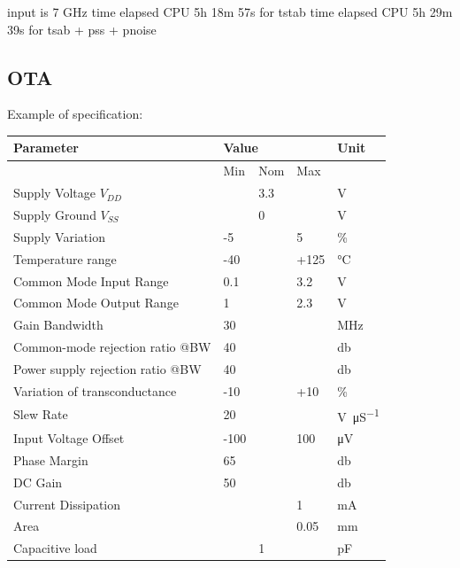 \documentclass{article}
\begin{document}
input is 7 GHz 
time elapsed CPU 5h 18m 57s for tstab 
time elapsed CPU 5h 29m 39s for tsab + pss + pnoise

\subsection{OTA}

Example of specification:

\begin{table}[ht!]
	\begin{tabular}{|l|l|l|l|l|}
		\rowcolor{LightCyan}\hline
		Parameter                        & \multicolumn{3}{l|}{Value}                & Unit\\ \hline
			                        & Min & Nom & Max              & \\ \hline
		Supply Voltage $V_{DD}$                 & & 3.3 & & \unit{\volt} \\ \hline
		Supply Ground   $V_{SS}$                 & & 0 & & \unit{\volt} \\ \hline
		Supply Variation                 & -5 & & 5     &   \unit{\percent}        \\ \hline
		Temperature range                & -40 & & +125 & \unit{\degreeCelsius}     \\ \hline
		Common Mode Input Range          & 0.1 & & 3.2 & \unit{\volt}        \\ \hline
		Common Mode Output Range         & 1  & & 2.3    &   \unit{\volt}    \\ \hline
		Gain Bandwidth                   & 30 & &          & \unit{\MHz}\\ \hline
		Common-mode rejection ratio @BW  & 40 & &          & \unit{\decibel}\\ \hline
		Power supply rejection ratio @BW & 40  & &        & \unit{\decibel}  \\ \hline
		Variation of transconductance    & -10 & & +10        & \unit{\percent}     \\ \hline
		Slew Rate                        & 20 & & &  \unit{\volt\per\micro\siemens}   \\ \hline
		Input Voltage Offset             & -100& & 100          &  \unit{\micro\volt}  \\ \hline
		Phase Margin                     & 65 & & &\unit{\decibel}         \\ \hline
		DC Gain                          & 50 & & &\unit{\decibel}       \\ \hline
		Current Dissipation              &  & & 1& \unit{\milli\ampere}         \\ \hline
		Area                             & & & 0.05 & \unit{\milli\metre}     \\ \hline
		Capacitive load                  & & 1 &  & \unit{\pico\farad}           \\   \hline
	\end{tabular}
\end{table}
\end{document}
